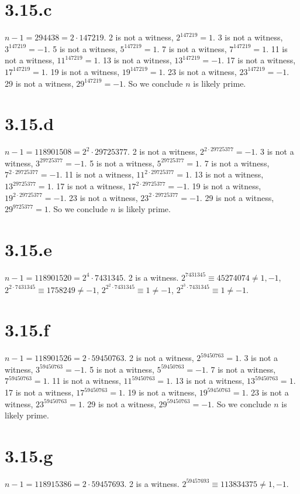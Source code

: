 \documentclass{article}
\begin{document}
\section*{3.15.c}
$n-1 = 294438 = 2 \cdot 147219$. 2 is not a witness, $2^{147219} = 1$. 3 is not a witness, $3^{147219} = -1$. 5 is not a witness, $5^{147219} = 1$. 7 is not a witness, $7^{147219} = 1$. 11 is not a witness, $11^{147219} = 1$. 13 is not a witness, $13^{147219} = -1$. 17 is not a witness, $17^{147219} = 1$. 19 is not a witness, $19^{147219} = 1$. 23 is not a witness, $23^{147219} = -1$. 29 is not a witness, $29^{147219} = -1$. So we conclude $n$ is likely prime.

\section*{3.15.d}
$n-1 = 118901508 = 2^2 \cdot 29725377$. 2 is not a witness, $2^{2\cdot29725377} = -1$. 3 is not a witness, $3^{29725377} = -1$. 5 is not a witness, $5^{29725377} = 1$. 7 is not a witness, $7^{2\cdot29725377} = -1$. 11 is not a witness, $11^{2\cdot29725377} = 1$. 13 is not a witness, $13^{29725377} = 1$. 17 is not a witness, $17^{2\cdot29725377} = -1$. 19 is not a witness, $19^{2\cdot29725377} = -1$. 23 is not a witness, $23^{2\cdot29725377} = -1$. 29 is not a witness, $29^{9725377} = 1$. So we conclude $n$ is likely prime.

\section*{3.15.e}
$n - 1 = 118901520 = 2^4 \cdot 7431345$. 2 is a witness. $2^{7431345} \equiv 45274074 \neq 1,-1$, $2^{2\cdot7431345} \equiv 1758249 \neq -1$, $2^{2^2\cdot7431345} \equiv 1 \neq -1$, $2^{2^3\cdot7431345} \equiv 1 \neq -1$.

\section*{3.15.f}
$n - 1 = 118901526 = 2 \cdot 59450763$. 2 is not a witness, $2^{59450763} = 1$. 3 is not a witness, $3^{59450763} = -1$. 5 is not a witness, $5^{59450763} = -1$. 7 is not a witness, $7^{59450763} = 1$. 11 is not a witness, $11^{59450763} = 1$. 13 is not a witness, $13^{59450763} = 1$. 17 is not a witness, $17^{59450763} = 1$. 19 is not a witness, $19^{59450763} = 1$. 23 is not a witness, $23^{59450763} = 1$. 29 is not a witness, $29^{59450763} = -1$. So we conclude $n$ is likely prime.

\section*{3.15.g}
$n - 1 = 118915386 = 2 \cdot 59457693$. 2 is a witness. $2^{59457693} \equiv 113834375 \neq 1,-1$.
\end{document}
